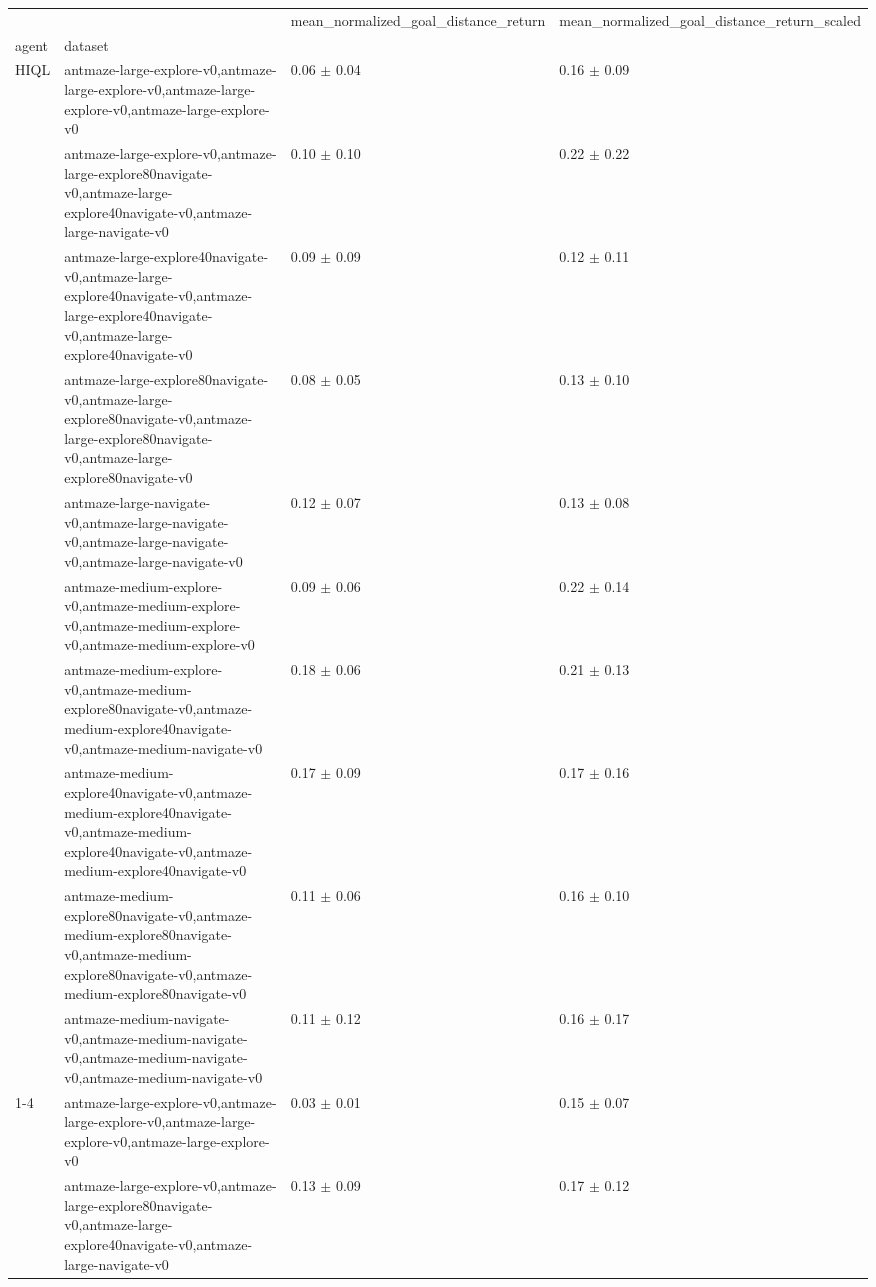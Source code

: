 \begin{tabular}{llll}
\toprule
 &  & mean_normalized_goal_distance_return & mean_normalized_goal_distance_return_scaled \\
agent & dataset &  &  \\
\midrule
\multirow[t]{10}{*}{HIQL} & antmaze-large-explore-v0,antmaze-large-explore-v0,antmaze-large-explore-v0,antmaze-large-explore-v0 & 0.06 $\pm$ 0.04 & 0.16 $\pm$ 0.09 \\
 & antmaze-large-explore-v0,antmaze-large-explore80navigate-v0,antmaze-large-explore40navigate-v0,antmaze-large-navigate-v0 & 0.10 $\pm$ 0.10 & 0.22 $\pm$ 0.22 \\
 & antmaze-large-explore40navigate-v0,antmaze-large-explore40navigate-v0,antmaze-large-explore40navigate-v0,antmaze-large-explore40navigate-v0 & 0.09 $\pm$ 0.09 & 0.12 $\pm$ 0.11 \\
 & antmaze-large-explore80navigate-v0,antmaze-large-explore80navigate-v0,antmaze-large-explore80navigate-v0,antmaze-large-explore80navigate-v0 & 0.08 $\pm$ 0.05 & 0.13 $\pm$ 0.10 \\
 & antmaze-large-navigate-v0,antmaze-large-navigate-v0,antmaze-large-navigate-v0,antmaze-large-navigate-v0 & 0.12 $\pm$ 0.07 & 0.13 $\pm$ 0.08 \\
 & antmaze-medium-explore-v0,antmaze-medium-explore-v0,antmaze-medium-explore-v0,antmaze-medium-explore-v0 & 0.09 $\pm$ 0.06 & 0.22 $\pm$ 0.14 \\
 & antmaze-medium-explore-v0,antmaze-medium-explore80navigate-v0,antmaze-medium-explore40navigate-v0,antmaze-medium-navigate-v0 & 0.18 $\pm$ 0.06 & 0.21 $\pm$ 0.13 \\
 & antmaze-medium-explore40navigate-v0,antmaze-medium-explore40navigate-v0,antmaze-medium-explore40navigate-v0,antmaze-medium-explore40navigate-v0 & 0.17 $\pm$ 0.09 & 0.17 $\pm$ 0.16 \\
 & antmaze-medium-explore80navigate-v0,antmaze-medium-explore80navigate-v0,antmaze-medium-explore80navigate-v0,antmaze-medium-explore80navigate-v0 & 0.11 $\pm$ 0.06 & 0.16 $\pm$ 0.10 \\
 & antmaze-medium-navigate-v0,antmaze-medium-navigate-v0,antmaze-medium-navigate-v0,antmaze-medium-navigate-v0 & 0.11 $\pm$ 0.12 & 0.16 $\pm$ 0.17 \\
\cline{1-4}
\multirow[t]{10}{*}{QRL} & antmaze-large-explore-v0,antmaze-large-explore-v0,antmaze-large-explore-v0,antmaze-large-explore-v0 & 0.03 $\pm$ 0.01 & 0.15 $\pm$ 0.07 \\
 & antmaze-large-explore-v0,antmaze-large-explore80navigate-v0,antmaze-large-explore40navigate-v0,antmaze-large-navigate-v0 & 0.13 $\pm$ 0.09 & 0.17 $\pm$ 0.12 \\

\end{tabular}

